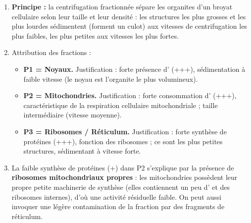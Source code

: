 \documentclass[11pt]{article}
\newcommand{\cle}[1]{{\popxbold\color{popdark}#1}}
\begin{document}
\begin{corrige}
\begin{enumerate}
    \item \textbf{Principe :} la centrifugation fractionnée sépare les organites d'un broyat cellulaire selon leur \cle{taille} et leur \cle{densité} : les structures les plus grosses et les plus lourdes sédimentent (forment un culot) aux vitesses de centrifugation les plus faibles, les plus petites aux vitesses les plus fortes.
    \item Attribution des fractions :
    \begin{itemize}
        \item \textbf{P1 = Noyaux.} Justification : forte présence d' (+++), sédimentation à faible vitesse (le noyau est l'organite le plus volumineux).
        \item \textbf{P2 = Mitochondries.} Justification : forte consommation d' (+++), caractéristique de la respiration cellulaire mitochondriale ; taille intermédiaire (vitesse moyenne).
        \item \textbf{P3 = Ribosomes / Réticulum.} Justification : forte synthèse de protéines (+++), fonction des ribosomes ; ce sont les plus petites structures, sédimentant à vitesse forte.
    \end{itemize}
    \item La faible synthèse de protéines (+) dans P2 s'explique par la présence de \textbf{ribosomes mitochondriaux propres} : les mitochondries possèdent leur propre petite machinerie de synthèse (elles contiennent un peu d' et des ribosomes internes), d'où une activité résiduelle faible. On peut aussi invoquer une légère contamination de la fraction par des fragments de réticulum.
\end{enumerate}
\end{corrige}
\end{document}
